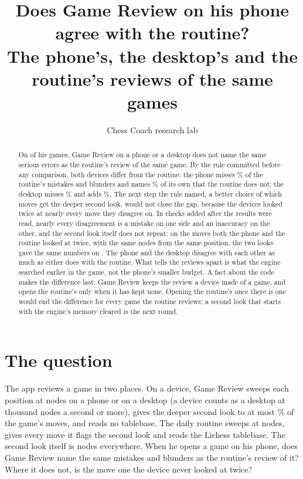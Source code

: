 \documentclass[11pt]{article}
\title{Does Game Review on his phone agree with the routine?\\[0.3em]
\large The phone's, the desktop's and the routine's reviews of the same \Cases{} games}
\author{Chess Coach research lab}
\date{}
\begin{document}
\maketitle

\begin{abstract}
On \Cases{} of his games, Game Review on a phone or a desktop does not name the same serious errors
as the routine's review of the same game. By the rule committed before any comparison, both devices
differ from the routine: the phone misses \PhoneMiss\% of the routine's mistakes and blunders and
names \PhoneExtraShare\% of its own that the routine does not; the desktop misses \DesktopMiss\%
and adds \DesktopExtraShare\%. The next step the rule named, a better choice of which moves get the
deeper second look, would not close the gap, because the devices looked twice at nearly every move
they disagree on. In checks added after the results were read, nearly every disagreement is a
mistake on one side and an inaccuracy on the other, and the second look itself does not repeat: on
the \PhoneBothLooked{} moves both the phone and the routine looked at twice, with the same nodes from
the same position, the two looks gave the same numbers on \PhoneIdentical. The phone and the desktop
disagree with each other as much as either does with the routine. What tells the reviews apart is
what the engine searched earlier in the game, not the phone's smaller budget. A fact about the code
makes the difference last: Game Review keeps the review a device made of a game, and opens the
routine's only when it has kept none. Opening the routine's once there is one would end the
difference for every game the routine reviews; a second look that starts with the engine's memory
cleared is the next round.
\end{abstract}

\section{The question}

The app reviews a game in two places. On a device, Game Review sweeps each position at
\PhoneSweep{} nodes on a phone or \DesktopSweep{} on a desktop (a device counts as a desktop at
\DesktopKnps{} thousand nodes a second or more), gives the deeper second look to at most
\PassShare\% of the game's moves, and reads no tablebase. The daily routine sweeps at
\RoutineSweep{} nodes, gives every move it flags the second look and reads the Lichess tablebase.
The second look itself is \VerifyNodes{} nodes everywhere. When he opens a game on his phone, does
Game Review name the same mistakes and blunders as the routine's review of it? Where it does not, is
the move one the device never looked at twice?
\end{document}
